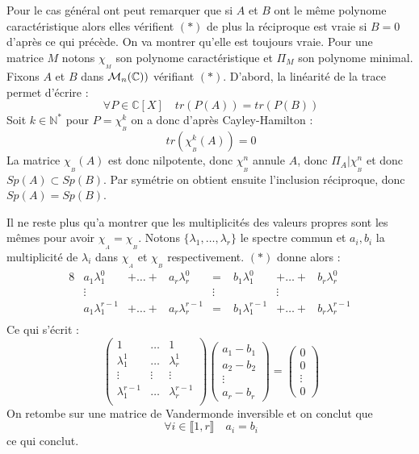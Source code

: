 \documentclass[letterpaper,10pt]{article}
\begin{document}
Pour le cas général ont peut remarquer que si $A$ et $B$ ont le même polynome
 caractéristique alors elles vérifient $(*)$ de plus la réciproque est vraie 
 si $B=0$ d'après ce qui précède. On va montrer qu'elle est toujours vraie. 
 Pour une matrice $M$ notons $\chi_{_M}$ son polynome caractéristique et $\Pi{_M}$ 
 son polynome minimal. Fixons $A$ et $B$ dans $\mathcal{M}_n(\mathbb{C}))$ vérifiant $(*) $.
  D'abord, la linéarité de la trace permet d'écrire : \[\ \forall P \in 
  \mathbb{C}\left[X\right] \quad tr(P(A)) = tr(P(B)) \] 
Soit $k \in \mathbb{N}^*$ pour  $P = \chi_{_B}^k$ on a donc 
d'après Cayley-Hamilton : \[\ tr(\chi_{_B}^k(A)) = 0 \] La matrice
 $\chi_{_B}(A)$ est donc nilpotente, donc $\chi_{_B}^n$ annule $A$, donc
  $\Pi_{A} | \chi_{_B}^n$ et donc $Sp(A) \subset Sp(B)$. Par symétrie on 
  obtient ensuite l'inclusion réciproque, donc $Sp(A) = Sp(B)$.

Il ne reste plus qu'a montrer que les multiplicités des valeurs propres sont les
 mêmes pour avoir $\chi_{_A} =\chi_{_B}$. Notons $\{\lambda_1,\ldots,\lambda_r\}$ 
 le spectre commun et $a_i, b_i$ la multiplicité de $\lambda_i$ dans $\chi_{_A}$ 
 et $\chi_{_B}$ respectivement. $(*)$ donne alors :
\begin{alignat*}{8}
 &a_1\lambda_1^0 &+ \ldots  +& a_r\lambda_r^0 &=&\; b_1\lambda_1^0 &+ \ldots  +& b_r\lambda_r^0 \\
&\vdots & & & \vdots & & \vdots &\\
 &a_1\lambda_1^{r-1} &+ \ldots  +& a_r\lambda_r^{r-1} &=&\; b_1\lambda_1^{r-1} &+ \ldots  +& b_r\lambda_r^{r-1} \\
\end{alignat*} Ce qui s'écrit :
\[\ \begin{pmatrix}
1  &\ldots & 1 \\
\lambda_1^1 & \ldots & \lambda_r^1 \\
\vdots & \vdots & \vdots \\
\lambda_1^{r-1} & \ldots & \lambda_r^{r-1} \\
\end{pmatrix}\begin{pmatrix}a_1-b_1 \\ a_2-b_2\\ \vdots \\ a_r-b_r
\end{pmatrix}
=\begin{pmatrix}0 \\ 0\\ \vdots \\ 0
\end{pmatrix}\] On retombe sur une matrice de Vandermonde inversible et on conclut que \[\ \forall i \in \llbracket 1,r \rrbracket \quad a_i= b_i \] ce qui conclut.
\end{document}
